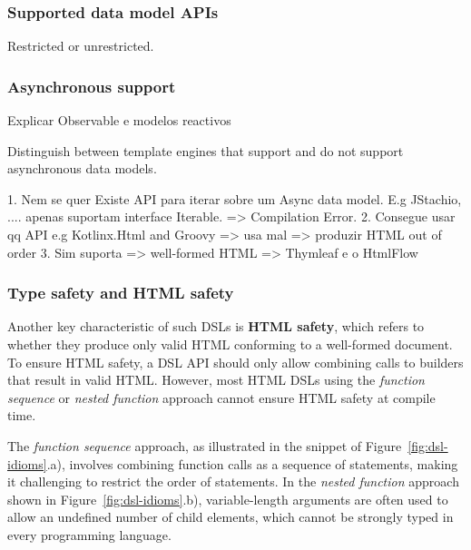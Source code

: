 \subsubsection{Supported data model APIs}

Restricted or unrestricted.


\subsubsection{Asynchronous support}

Explicar Observable e modelos reactivos

Distinguish between template engines that support and do not support asynchronous data models.

1. Nem se quer Existe API para iterar sobre um Async data model. 
   E.g JStachio, .... apenas suportam interface Iterable. => Compilation Error.
2. Consegue usar qq API e.g Kotlinx.Html and Groovy  => usa mal => produzir HTML out of order
3. Sim suporta => well-formed HTML => Thymleaf e o HtmlFlow


\subsubsection{Type safety and HTML safety}

Another key characteristic of such DSLs is \textbf{HTML safety}, which refers to
whether they produce only valid HTML conforming to a well-formed document.
To ensure HTML safety, a DSL API should only allow combining calls to builders
that result in valid HTML. 
However, most HTML DSLs using the \textit{function sequence} or \textit{nested
function} approach cannot ensure HTML safety at compile time. 

The \textit{function sequence} approach, as illustrated in the snippet of
Figure~\ref{fig:dsl-idioms}.a), involves combining function calls as a sequence of
statements, making it challenging to restrict the order of statements. 
In the \textit{nested function} approach shown in
Figure~\ref{fig:dsl-idioms}.b), variable-length arguments are often used to
allow an undefined number of child elements, which cannot be strongly typed in
every programming language.

